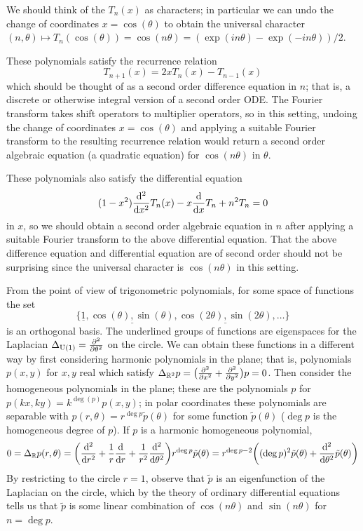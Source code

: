 \documentclass[../../rtnotes.tex]{subfiles}
\begin{document}
We should think of the $T_n(x)$ as characters; in particular we can undo the change of coordinates $x = \cos(\theta)$ to obtain the universal character $(n,\theta)\mapsto T_n(\cos(\theta)) = \cos(n\theta) = (\exp(in\theta)-\exp(-in\theta))/2$.

These polynomials satisfy the recurrence relation
\[T_{n+1}(x) = 2xT_n(x) - T_{n-1}(x)\]
which should be thought of as a second order difference equation in $n$; that is, a discrete or otherwise integral version of a second order ODE. The Fourier transform takes shift operators to multiplier operators, so in this setting, undoing the change of coordinates $x = \cos(\theta)$ and applying a suitable Fourier transform to the resulting recurrence relation would return a second order algebraic equation (a quadratic equation) for $\cos(n\theta)$ in $\theta$.

These polynomials also satisfy the differential equation
\[(1-x^2)\dv[2]{x}T_n(x)-x\dv{x}T_n+ n^2T_n = 0\]
in $x$, so we should obtain a second order algebraic equation in $n$ after applying a suitable Fourier transform to the above differential equation. That the above difference equation and differential equation are of second order should not be surprising since the universal character is $\cos(n\theta)$ in this setting.

From the point of view of trigonometric polynomials, for some space of functions the set
\[\{\underline{1},\underline{\cos(\theta), \sin(\theta)}, \underline{\cos(2\theta),\sin(2\theta)},\dots\}\]
is an orthogonal basis. The underlined groups of functions are eigenspaces for the Laplacian $\Delta_{\operatorname{U}(1)} = \pdv[2]{\theta}$ on the circle. We can obtain these functions in a different way by first considering harmonic polynomials in the plane; that is, polynomials $p(x,y)$ for $x,y$ real which satisfy $\Delta_{\mathbb R^2}p = \bigl(\pdv[2]{x} + \pdv[2]{y}\bigr)p = 0$. Then consider the homogeneous polynomials in the plane; these are the polynomials $p$ for $p(kx,ky) = k^{\deg(p)}p(x,y)$; in polar coordinates these polynomials are separable with $p(r,\theta) = r^{\deg p}\tilde p(\theta)$ for some function $\tilde p(\theta)$ ($\deg p$ is the homogeneous degree of $p$). If $p$ is a harmonic homogeneous polynomial,
\[0 = \Delta_{\mathbb R}p(r,\theta) = \biggl(\dv[2]{r}+\frac{1}{r}\dv{r}+\frac{1}{r^2}\dv[2]{\theta}\biggr)r^{\deg p}\tilde p(\theta) = r^{\deg p - 2}\biggl((\deg p)^2\tilde p(\theta)+\dv[2]{\theta}\tilde p(\theta)\biggr)\]
By restricting to the circle $r = 1$, observe that $\tilde p$ is an eigenfunction of the Laplacian on the circle, which by the theory of ordinary differential equations tells us that $\tilde p$ is some linear combination of $\cos(n\theta)$ and $\sin(n\theta)$ for $n = \deg p$.
\end{document}
